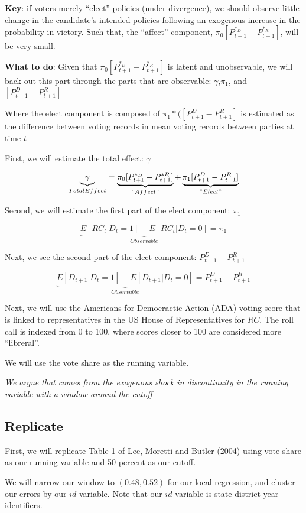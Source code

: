 \documentclass[
]{book}
\begin{document}
\textbf{Key}: if voters merely ``elect'' policies (under divergence), we should observe little change in the candidate's intended policies following an exogenous increase in the probability in victory. Such that, the ``affect'' component, \(\pi_0 [P^{\ast_D}_{t+1}-P^{\ast_R}_{t+1}]\), will be very small.

\textbf{What to do}: Given that \(\pi_0 [P^{\ast_D}_{t+1}-P^{\ast_R}_{t+1}]\) is latent and unobservable, we will back out this part through the parts that are observable: \(\gamma\),\(\pi_1\), and \([P^D_{t+1}-P^R_{t+1}]\)

Where the elect component is composed of \(\pi_1 \ast ([P^D_{t+1}-P^R_{t+1}]\) is estimated as the difference between voting records in mean voting records between parties at time \(t\)

First, we will estimate the total effect: \(\gamma\)

\[ \underbrace{\gamma}_{Total Effect}=\underbrace{\pi_0 [P^{\ast_D}_{t+1}-P^{\ast R}_{t+1}]}_{"Affect"}+\underbrace{\pi_1 [P^{D}_{t+1}-P^{R}_{t+1}]}_{"Elect"} \]

Second, we will estimate the first part of the elect component: \(\pi_1\)

\[ \underbrace{E[RC_t|D_t=1]-E[RC_t|D_t=0]}_{Observable} = \pi_1 \]

Next, we see the second part of the elect component: \(P^D_{t+1}-P^R_{t+1}\)

\[ \underbrace{E[D_{t+1}|D_t=1]-E[D_{t+1}|D_t=0]}_{Observable}=P^D_{t+1}-P^R_{t+1} \]

Next, we will use the Americans for Democractic Action (ADA) voting score that is linked to representatives in the US House of Representatives for \(RC\). The roll call is indexed from 0 to 100, where scores closer to 100 are considered more ``libreral''.

We will use the vote share as the running variable.

\emph{We argue that comes from the exogenous shock in discontinuity in the running variable with a window around the cutoff}

\subsection{Replicate}\label{replicate}

First, we will replicate Table 1 of Lee, Moretti and Butler (2004) using vote share as our running variable and 50 percent as our cutoff.

We will narrow our window to \((0.48,0.52)\) for our local regression, and cluster our errors by our \(id\) variable. Note that our \(id\) variable is state-district-year identifiers.
\end{document}
